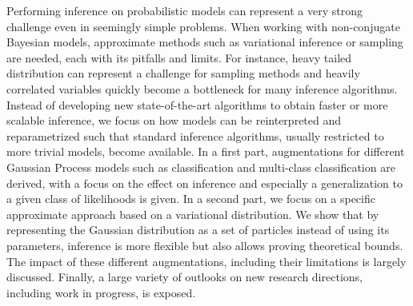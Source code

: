 
\ifCLASSINFOlangDE
{}
\fi

\begin{abstracts}        %
Performing inference on probabilistic models can represent a very strong challenge even in seemingly simple problems.
When working with non-conjugate Bayesian models, approximate methods such as variational inference or sampling are needed, each with its pitfalls and limits.
For instance, heavy tailed distribution can represent a challenge for sampling methods and heavily correlated variables quickly become a bottleneck for many inference algorithms.
Instead of developing new state-of-the-art algorithms to obtain faster or more scalable inference, we focus on how models can be reinterpreted and reparametrized such that standard inference algorithms, usually restricted to more trivial models, become available.
In a first part, augmentations for different Gaussian Process models such as classification and multi-class classification are derived, with a focus on the effect on inference and especially a generalization to a given class of likelihoods is given.
In a second part, we focus on a specific approximate approach based on a variational distribution.
We show that by representing the Gaussian distribution as a set of particles instead of using its parameters, inference is more flexible but also allows proving theoretical bounds.
The impact of these different augmentations, including their limitations is largely discussed.
Finally, a large variety of outlooks on new research directions, including work in progress, is exposed.


\end{abstracts}
\ifCLASSINFOlangDE
{}
\fi

